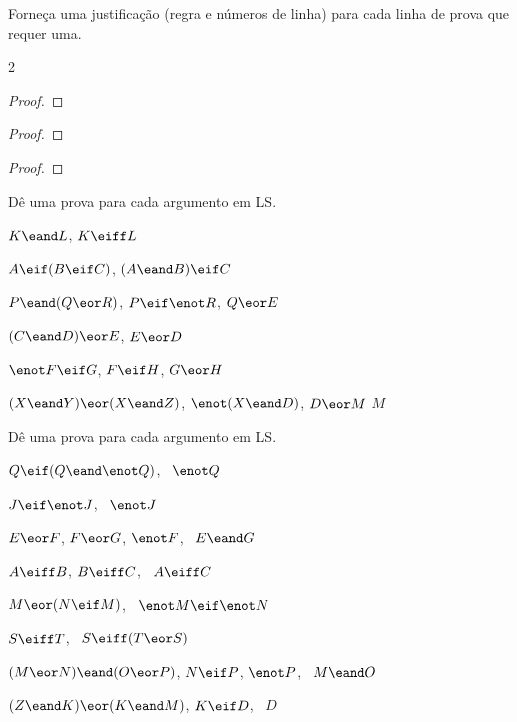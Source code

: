\solutions
\problempart
\label{pr.justifyLSproof}
Forneça uma justificação (regra e números de linha) para cada linha de prova que requer uma.
\begin{multicols}{2}
\begin{proof}
 {}
 {}
\end{proof}

\begin{proof}
\open
\close
{}
\end{proof}

\begin{proof}
\open
	 {}
	\open
	\close
\close
{}
\end{proof}
\end{multicols}

\solutions
\problempart
\label{pr.solvedSLproofs}
Dê uma prova para cada argumento em LS.
\begin{earg}
\item $K\eand L$, \therefore $K\eiff L$
\item $A\eif (B\eif C)$, \therefore $(A\eand B)\eif C$
\item $P \eand (Q\eor R)$, $P\eif \enot R$, \therefore $Q\eor E$
\item $(C\eand D)\eor E$, \therefore $E\eor D$
\item $\enot F\eif G$, $F\eif H$, \therefore $G\eor H$
\item $(X\eand Y)\eor(X\eand Z)$, $\enot(X\eand D)$, $D\eor M$ \therefore $M$
\end{earg}

\problempart
Dê uma prova para cada argumento em LS.
\begin{earg}
\item $Q\eif(Q\eand\enot Q)$, \therefore\ $\enot Q$
\item $J\eif\enot J$, \therefore\ $\enot J$
\item $E\eor F$, $F\eor G$, $\enot F$, \therefore\ $E \eand G$
\item $A\eiff B$, $B\eiff C$, \therefore\ $A\eiff C$
\item $M\eor(N\eif M)$, \therefore\ $\enot M \eif \enot N$
\item $S\eiff T$, \therefore\ $S\eiff (T\eor S)$
\item $(M \eor N) \eand (O \eor P)$, $N \eif P$, $\enot P$, \therefore\ $M\eand O$
\item $(Z\eand K) \eor (K\eand M)$, $K \eif D$, \therefore\ $D$
\end{earg}



